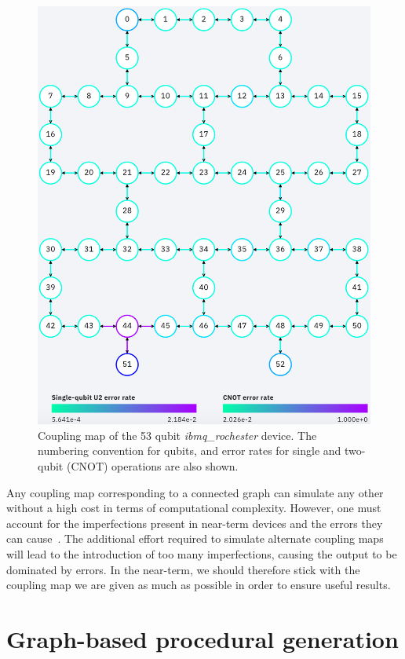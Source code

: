 \documentclass[conference]{IEEEtran}
\begin{document}
\begin{figure}[htbp]
\begin{center}
\includegraphics[width=0.95\columnwidth]{figures/rochester.png}
\caption{Coupling map of the 53 qubit \textit{ibmq\_rochester} device. The numbering convention for qubits, and error rates for single and two-qubit (CNOT) operations are also shown.}
\label{rochester}
\end{center}
\end{figure}

Any coupling map corresponding to a connected graph can simulate any other without a high cost in terms of computational complexity. However, one must account for the imperfections present in near-term devices and the errors they can cause~\cite{mckay:19}. The additional effort required to simulate alternate coupling maps will lead to the introduction of too many imperfections, causing the output to be dominated by errors. In the near-term, we should therefore stick with the coupling map we are given as much as possible in order to ensure useful results.


\section{Graph-based procedural generation}
\end{document}
